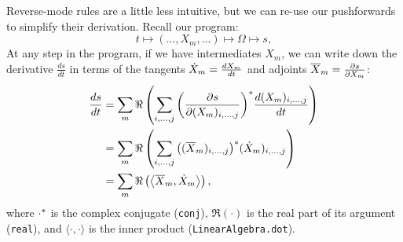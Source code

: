 \documentclass[../main.tex]{subfiles}
\begin{document}
\begin{refsection}
Reverse-mode rules are a little less intuitive, but we can re-use our pushforwards to simplify their derivation.
Recall our program:
\[t \mapsto (\ldots, X_m, \ldots) \mapsto \Omega \mapsto s,\]
At any step in the program, if we have intermediates $X_m$, we can write down the derivative $\frac{ds}{dt}$ in terms of the tangents $\dot{X}_m = \frac{dX_m}{dt}$ and adjoints $\overline{X}_m = \frac{\partial s}{\partial X_m}$:
\begin{align*}
\frac{ds}{dt}
    &= \sum_m \Re\left( \sum_{i,\ldots,j}
           {\left(  \frac{\partial s}{\partial (X_m)_{i,\ldots,j}}  \right)}^*
           \frac{d (X_m)_{i,\ldots,j}}{dt}
       \right)\\
    &= \sum_m \Re\left( \sum_{i,\ldots,j}
           {\left(  (\overline{X}_m)_{i,\ldots,j}  \right)}^*
           (\dot{X}_m)_{i,\ldots,j}
       \right)\\
    &= \sum_m \Re\left(
           \left\langle  \overline{X}_m ,  \dot{X}_m  \right\rangle
       \right),
\end{align*}
where ${\cdot}^*$ is the complex conjugate (\texttt{conj}), $\Re(\cdot)$ is the real part of its argument (\texttt{real}), and $\langle \cdot, \cdot \rangle$ is the inner product (\texttt{LinearAlgebra.dot}).\footnotemark



\end{refsection}
\end{document}
